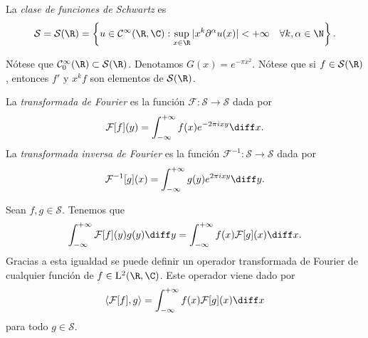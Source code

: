 \documentclass{article}
\begin{document}
\begin{definition}
  La \emph{clase de funciones de Schwartz} es
  \[ \mathcal{S} = \mathcal{S}(\R) = \left\{u \in \mathcal{C}^{\infty}(\R, \C) : \sup_{x\in\R} |x^k
      \partial^{\alpha} u(x)| < +\infty \quad \forall k, \alpha \in \N\right\}. \]
\end{definition}
Nótese que $\mathcal{C}_0^\infty(\R) \subset \mathcal{S}(\R)$. Denotamos $G(x) = e^{-\pi
  x^2}$. Nótese que si $f \in \mathcal{S}(\R)$, entonces $f'$ y $x^k f$ son elementos de
$\mathcal{S}(\R)$.

\begin{definition}
  La \emph{transformada de Fourier} es la función $\mathcal{F} \colon \mathcal{S} \to \mathcal{S}$
  dada por
  \[ \mathcal{F}[f](y) = \int_{-\infty}^{+\infty} f(x) e^{-2\pi i xy} \diff x. \] La
  \emph{transformada inversa de Fourier} es la función
  $\mathcal{F}^{-1} \colon \mathcal{S} \to \mathcal{S}$ dada por
  \[ \mathcal{F}^{-1}[g](x) = \int_{-\infty}^{+\infty} g(y) e^{2\pi i xy} \diff y. \]
\end{definition}
\begin{remark}
  Sean $f,g \in \mathcal{S}$.  Tenemos que
  \[ \int_{-\infty}^{+\infty} \mathcal{F}[f](y)g(y) \diff y = \int_{-\infty}^{+\infty}
    f(x)\mathcal{F}[g](x) \diff x. \] Gracias a esta igualdad se puede definir un operador
  transformada de Fourier de cualquier función de $f \in \mathrm{L}^2(\R, \C)$. Este operador
  viene dado por
  \[ \left\langle \mathcal{F}[f], g \right\rangle = \int_{-\infty}^{+\infty} f(x) \mathcal{F}[g](x)
    \diff x\] para todo $g \in \mathcal{S}$.
\end{remark}
\end{document}
